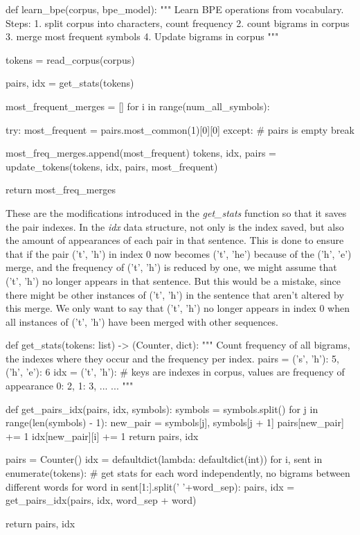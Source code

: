 \begin{python}
def learn_bpe(corpus, bpe_model):
  """
  Learn BPE operations from vocabulary.
  Steps:
  1. split corpus into characters, count frequency
  2. count bigrams in corpus
  3. merge most frequent symbols
  4. Update bigrams in corpus 
  """

  tokens = read_corpus(corpus)

  pairs, idx = get_stats(tokens)

  most_frequent_merges = []
  for i in range(num_all_symbols):

    try:
      most_frequent = pairs.most_common(1)[0][0]
    except:
      # pairs is empty
      break

    most_freq_merges.append(most_frequent)
    tokens, idx, pairs = update_tokens(tokens, idx, pairs, most_frequent)

  return most_freq_merges
\end{python}

These are the modifications introduced in the \emph{get\_stats} function so that it saves the pair indexes. In the \emph{idx} data structure, not only is the index saved, but also the amount of appearances of each pair in that sentence. This is done to ensure that if the pair ('t', 'h') in index 0 now becomes ('t', 'he') because of the ('h', 'e') merge, and the frequency of ('t', 'h') is reduced by one, we might assume that ('t', 'h') no longer appears in that sentence. But this would be a mistake, since there might be other instances of ('t', 'h') in the sentence that aren't altered by this merge. We only want to say that ('t', 'h') no longer appears in index 0 when all instances of ('t', 'h') have been merged with other sequences.

\begin{python}
def get_stats(tokens: list) -> (Counter, dict):
  """
  Count frequency of all bigrams, the indexes where they occur and the frequency per index.
  pairs = {
      ('s', 'h'): 5,
      ('h', 'e'): 6
  }
  idx = {
      ('t', 'h'): {
          # keys are indexes in corpus, values are frequency of appearance
          0: 2,
          1: 3,
          ...
      }
      ...
  }
  """

  def get_pairs_idx(pairs, idx, symbols):
    symbols = symbols.split()
    for j in range(len(symbols) - 1):
      new_pair = symbols[j], symbols[j + 1]
      pairs[new_pair] += 1
      idx[new_pair][i] += 1
    return pairs, idx

  pairs = Counter()
  idx = defaultdict(lambda: defaultdict(int))
  for i, sent in enumerate(tokens):
    # get stats for each word independently, no bigrams between different words
    for word in sent[1:].split(' '+word_sep):
      pairs, idx = get_pairs_idx(pairs, idx, word_sep + word)

  return pairs, idx
\end{python}


